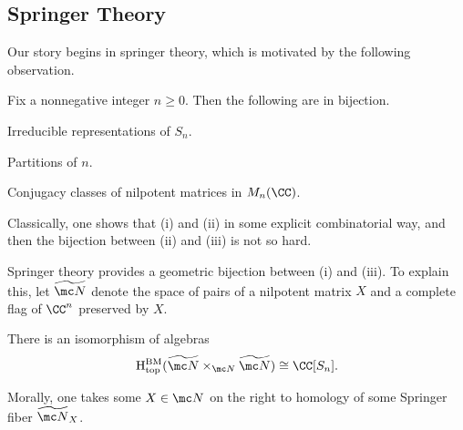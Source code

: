 \documentclass{article}
\begin{document}
\subsection{Springer Theory}
Our story begins in springer theory, which is motivated by the following observation.
\begin{theorem}
	Fix a nonnegative integer $n\ge0$. Then the following are in bijection.
	\begin{listroman}
		\item Irreducible representations of $S_n$.
		\item Partitions of $n$.
		\item Conjugacy classes of nilpotent matrices in $M_n(\CC)$.
	\end{listroman}
\end{theorem}
Classically, one shows that (i) and (ii) in some explicit combinatorial way, and then the bijection between (ii) and (iii) is not so hard.

Springer theory provides a geometric bijection between (i) and (iii). To explain this, let $\widetilde{\mc N}$ denote the space of pairs of a nilpotent matrix $X$ and a complete flag of $\CC^n$ preserved by $X$.
\begin{theorem}[Springer]
	There is an isomorphism of algebras
	\[\mathrm H^{\mathrm{BM}}_{\mathrm{top}}(\widetilde{\mc N}\times_{\mc N}\widetilde{\mc N})\cong\CC[S_n].\]
\end{theorem}
Morally, one takes some $X\in\mc N$ on the right to homology of some Springer fiber $\widetilde{\mc N}_X$.
\end{document}
